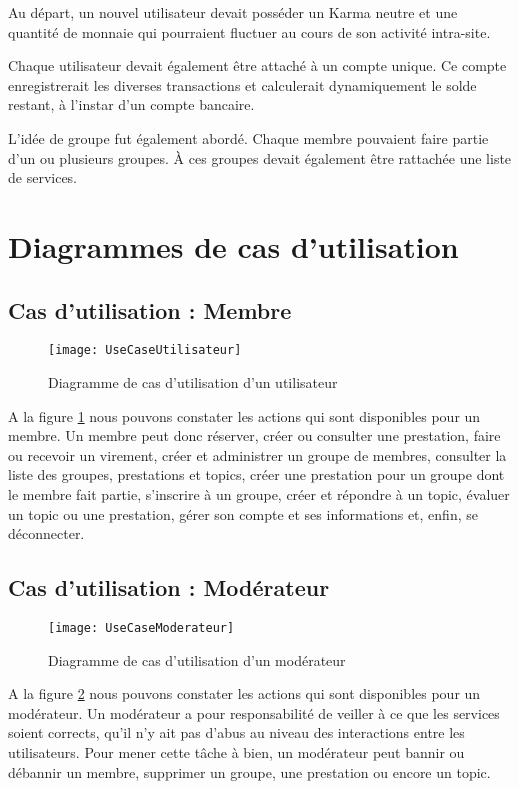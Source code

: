 Au départ, un nouvel utilisateur devait posséder un Karma neutre et une quantité de monnaie qui pourraient fluctuer au cours de son activité intra-site.

Chaque utilisateur devait également être attaché à un compte unique. Ce compte enregistrerait les diverses transactions et calculerait dynamiquement le solde restant, à l'instar d'un compte bancaire.

L'idée de groupe fut également abordé. Chaque membre pouvaient faire partie d'un ou plusieurs groupes. 
À ces groupes devait également être rattachée une liste de services.

\section{Diagrammes de cas d'utilisation}

\subsection{Cas d'utilisation : Membre}

\begin{figure}[ht]
\centering
\texttt{[image: UseCaseUtilisateur]}
\caption{Diagramme de cas d'utilisation d'un utilisateur}
\label{fig:UseCaseUtilisateur}
\end{figure}

A la figure \ref{fig:UseCaseUtilisateur} nous pouvons constater les actions qui sont disponibles pour un membre.
Un membre peut donc réserver, créer ou consulter une prestation, faire ou recevoir un virement, créer et administrer un groupe de membres, consulter la liste des groupes, prestations et topics, créer une prestation pour un groupe dont le membre fait partie, s'inscrire à un groupe, créer et répondre à un topic, évaluer un topic ou une prestation, gérer son compte et ses informations et, enfin, se déconnecter.

\subsection{Cas d'utilisation : Modérateur}

\begin{figure}[h]
\centering
\texttt{[image: UseCaseModerateur]}
\caption{Diagramme de cas d'utilisation d'un modérateur}
\label{fig:UseCaseModerateur}
\end{figure}

A la figure \ref{fig:UseCaseModerateur} nous pouvons constater les actions qui sont disponibles pour un modérateur.
Un modérateur a pour responsabilité de veiller à ce que les services soient corrects, qu'il n'y ait pas d'abus au niveau des interactions entre les utilisateurs.
Pour mener cette tâche à bien, un modérateur peut bannir ou débannir un membre, supprimer un groupe, une prestation ou encore un topic.

